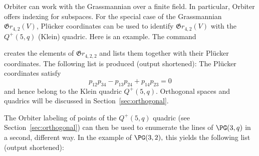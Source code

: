 Orbiter can work with the Grassmannian over a finite field. 
In particular, Orbiter offers indexing for subspaces.
For the special case of the Grassmannian ${\mathfrak Gr}_{4,2}(V)$, 
Pl\"ucker coordinates can be used to identify 
${\mathfrak Gr}_{4,2}(V)$ with the $Q^+(5,q)$ (Klein) quadric.
Here is an example. The command 


creates the elements of ${\mathfrak Gr}_{4,2,2}$ 
and lists them together with their Pl\"ucker coordinates.
The following list is produced (output shortened): 
The Pl\"ucker coordinates satisfy
$$
p_{12}p_{34} - p_{13}p_{24}+p_{14}p_{23}=0
$$
and hence belong to the Klein quadric $Q^+(5,q)$.
Orthogonal spaces and quadrics will 
be discussed in Section~\ref{sec:orthogonal}.

\bigskip


The Orbiter labeling of points of 
the $Q^+(5,q)$ quadric (see Section~\ref{sec:orthogonal}) 
can then be used to enumerate the lines of $\PG(3,q)$ in a second, different way.
In the example of $\PG(3,2),$ 
this yields the following list (output shortened):


